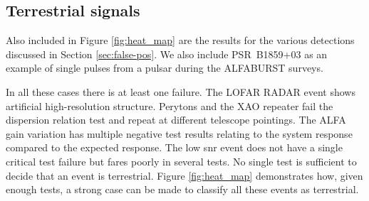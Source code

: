\documentclass[a4paper,fleqn,usenatbib]{mnras}
\begin{document}
\subsection{Terrestrial signals}

Also included in Figure \ref{fig:heat_map} are the results for the various
detections discussed in Section \ref{sec:false-pos}. We also include
PSR~B1859+03 as an example of single pulses from a pulsar during the ALFABURST
surveys.

In all these cases there is at least one failure.  The LOFAR RADAR event shows
artificial high-resolution structure.  Perytons and the XAO repeater fail the
dispersion relation test and repeat at different telescope pointings. The ALFA
gain variation has multiple negative test results relating to the system
response compared to the expected response.  The low \gls{snr} event does not
have a single critical test failure but fares poorly in several tests.  No
single test is sufficient to decide that an event is terrestrial. Figure
\ref{fig:heat_map} demonstrates how, given enough tests, a strong case can be
made to classify all these events as terrestrial.

%
\end{document}
